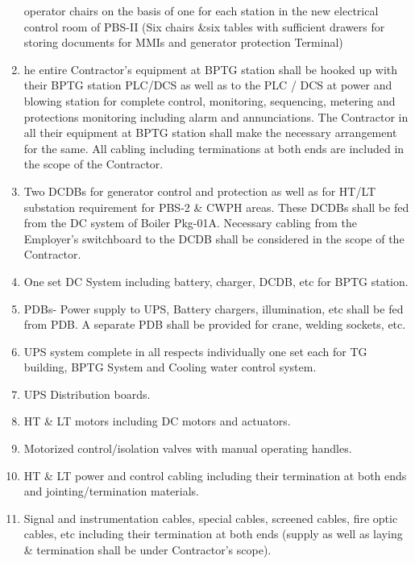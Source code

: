 \documentclass[english,11pt]{report}
\begin{document}
\begin{enumerate}
operator chairs on the basis of one for each station in the new electrical            control room of PBS-II (Six chairs &six tables with sufficient drawers for storing    documents for MMIs and generator protection Terminal)
\item he entire Contractor's equipment at BPTG station shall be hooked up
with their BPTG station PLC/DCS as well as to the PLC / DCS at power
and blowing station for complete control, monitoring, sequencing,
metering and protections monitoring including alarm and annunciations.
The Contractor in all their equipment at BPTG station shall make the
necessary arrangement for the same. All cabling including terminations at
both ends are included in the scope of the Contractor.
\item  Two DCDBs for generator control and protection as well as for
HT/LT substation requirement for PBS-2 & CWPH areas. These DCDBs
shall be fed from the DC system of Boiler Pkg-01A. Necessary cabling
from the Employer's switchboard to the DCDB shall be considered in the
scope of the Contractor.

\item One set DC System including battery, charger, DCDB, etc for BPTG
station.

\item PDBs- Power supply to UPS, Battery chargers, illumination, etc shall be
fed from PDB. A separate PDB shall be provided for crane, welding
sockets, etc.

\item UPS system complete in all respects individually one set each for TG
building, BPTG System and Cooling water control system.

\item UPS Distribution boards.

\item HT & LT motors including DC motors and actuators.

\item Motorized control/isolation valves with manual operating handles.

\item HT & LT power and control cabling including their termination at both
      ends and jointing/termination materials.

\item Signal and instrumentation cables, special cables, screened cables, fire
optic cables, etc including their termination at both ends (supply as well
as laying & termination shall be under Contractor's scope).


\end{enumerate}
\end{document}
